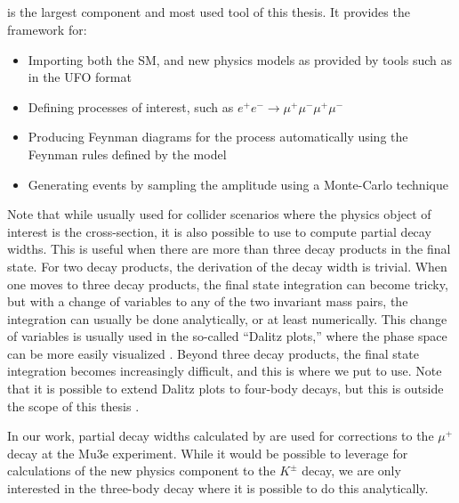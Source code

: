\subsection{\madgraph}
\madgraph is the largest component and most used tool of this thesis.
It provides the framework for:
\begin{itemize}
    \item Importing both the SM, and new physics models as provided by tools such as \feynrules in the UFO format
    \item Defining processes of interest, such as $e^+ e^- \rightarrow \mu^+ \mu^- \mu^+ \mu^-$
    \item Producing Feynman diagrams for the process automatically using the Feynman rules defined by the model
    \item Generating events by sampling the amplitude using a Monte-Carlo technique
\end{itemize}

Note that while usually used for collider scenarios where the physics object of interest is the cross-section, it is also possible to use \madgraph to compute partial decay widths.
This is useful when there are more than three decay products in the final state.
For two decay products, the derivation of the decay width is trivial.
When one moves to three decay products, the final state integration can become tricky, but with a change of variables to any of the two invariant mass pairs, the integration can usually be done analytically, or at least numerically.
This change of variables is usually used in the so-called ``Dalitz plots,'' where the phase space can be more easily visualized \cite{Agashe:2014kda}.
Beyond three decay products, the final state integration becomes increasingly difficult, and this is where we put \madgraph to use.
Note that it is possible to extend Dalitz plots to four-body decays, but this is outside the scope of this thesis \cite{2007JPhB...40.3091S}.

In our work, partial decay widths calculated by \madgraph are used for corrections to the $\mu^+$ decay at the Mu3e experiment.
While it would be possible to leverage \madgraph for calculations of the new physics component to the $K^\pm$ decay, we are only interested in the three-body decay where it is possible to do this analytically.

